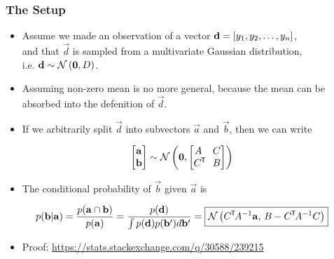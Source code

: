 \begin{frame} \frametitle{The Setup}
\begin{itemize}
  \item Assume we made an observation of a vector
    $\vec{d} = [y_1,y_2,\mathellipsis,y_n]$,\\
    and that $\vec{d}$ is sampled from a multivariate Gaussian
    distribution,\\i.e. $\vec{d}\sim\N{\vec{0},D}$.
  \vspace{1mm}
  \item Assuming non-zero mean is no more general, because the mean can be
    absorbed into the defenition of $\vec{d}$.
  \vspace{1mm}
  \item If we arbitrarily split $\vec{d}$ into subvectors
    $\vec{a}$ and $\vec{b}$, then we can write
\end{itemize}
\begin{equation}\label{eq:n1}
  \begin{bmatrix} \vec{a} \\ \vec{b} \end{bmatrix} \sim
    \N{\vec{0},\begin{bmatrix} A & C \\ C\T\!\! & B \end{bmatrix}}
\end{equation}
\begin{itemize}
  \item The conditional probability of $\vec{b}$ given $\vec{a}$ is
\end{itemize}
\vspace{1mm}
\begin{equation}
  p(\vec{b}|\vec{a})
  = \frac{p(\vec{a}\cap\vec{b})}{p(\vec{a})}
  = \frac{p(\vec{d})}{\int p(\vec{d})p(\vec{b}') d\vec{b}'}
  = \boxed{ \N{C\T\!A^{-1}\vec{a},\,B-C\T\!A^{-1}C} }
\end{equation}
\vspace{-5mm}
\begin{itemize}
  \item Proof: {\small\url{https://stats.stackexchange.com/q/30588/239215}}
\end{itemize}
\end{frame}

